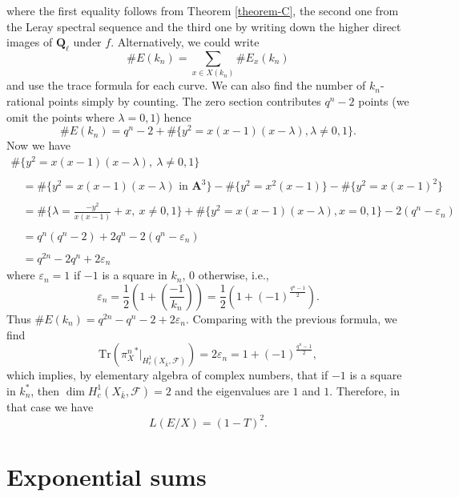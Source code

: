 \documentclass{stacks-project}
\theoremstyle{plain}
\theoremstyle{definition}
\theoremstyle{remark}
\numberwithin{equation}{subsection}
\begin{document}
where the first equality follows from
Theorem \ref{theorem-C},
the second one from
the Leray spectral sequence and the third one by writing down the higher direct
images of $\mathbf{Q}_\ell$ under $f$. Alternatively, we could write
$$
\# E(k_n) = \sum_{x \in X(k_n)} \# E_x(k_n)
$$
and use the trace formula for each curve. We can also find the number of
$k_n$-rational points simply by counting. The zero section contributes $q^n -2$
points (we omit the points where $\lambda = 0, 1$) hence
$$
\# E(k_n) =
q^n - 2 + \# \{y^2 = x(x - 1)(x - \lambda), \lambda\neq 0, 1\}.
$$
Now we have
$$
\begin{matrix}
\# \{y^2 = x(x - 1)(x - \lambda),\ \lambda\neq 0, 1\} \\
\\
\quad =
\# \{y^2 = x(x - 1)(x - \lambda)\text{ in }\mathbf{A}^3\}
- \# \{y^2 = x^2(x - 1)\} - \# \{y^2 = x(x - 1)^2\}\\
\\
\quad = \# \{\lambda = \frac{-y^2}{x(x - 1)} + x,\ x\neq 0, 1\} +
\# \{y^2 = x(x - 1)(x - \lambda), x = 0, 1\} - 2(q^n - \varepsilon_n) \\
\\
\quad = q^n(q^n - 2)+2q^n - 2(q^n - \varepsilon_n)\\
\\
\quad = q^{2n}-2q^n+2\varepsilon_n
\end{matrix}
$$
where $\varepsilon_n = 1$ if $-1$ is a square in $k_n$, 0 otherwise,
i.e.,
$$
\varepsilon_n = \frac{1}{2}\left(1+\left(\frac{-1}{k_n}\right)\right) =
\frac{1}{2}\left(1+(-1)^{\frac{q^n - 1}{2}}\right).
$$
Thus $ \# E(k_n) = q^{2n} - q^n - 2+ 2\varepsilon_n$.
Comparing with the previous formula, we find
$$
\text{Tr}({\pi_X^n}^* |_{H_c^1(X_{\bar k}, \mathcal{F})}) =
2 \varepsilon_n = 1 + (-1)^{\frac{q^n - 1}{2}},
$$
which implies, by elementary algebra of complex numbers, that if $-1$ is a
square in $k_n^*$, then $\dim H_c^1(X_{\bar k}, \mathcal{F}) = 2$ and the
eigenvalues are $1$ and $1$. Therefore, in that case we have
$$
L(E/X) = (1 - T)^2.
$$




\section{Exponential sums}
\label{section-exponential-sums}
\end{document}
